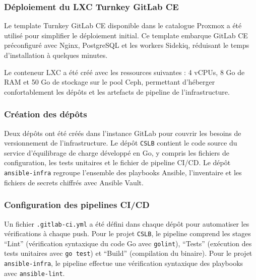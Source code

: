 \subsubsection{Déploiement du LXC Turnkey GitLab CE}

\par Le template Turnkey GitLab CE disponible dans le catalogue Proxmox a été utilisé pour simplifier le déploiement initial. Ce template embarque GitLab CE préconfiguré avec Nginx, PostgreSQL et les workers Sidekiq, réduisant le temps d'installation à quelques minutes.\\

\par Le conteneur LXC a été créé avec les ressources suivantes : 4 vCPUs, 8 Go de RAM et 50 Go de stockage sur le pool Ceph, permettant d'héberger confortablement les dépôts et les artefacts de pipeline de l'infrastructure.\\

\subsubsection{Création des dépôts}

\par Deux dépôts ont été créés dans l'instance GitLab pour couvrir les besoins de versionnement de l'infrastructure. Le dépôt \texttt{CSLB} contient le code source du service d'équilibrage de charge développé en Go, y compris les fichiers de configuration, les tests unitaires et le fichier de pipeline CI/CD. Le dépôt \texttt{ansible-infra} regroupe l'ensemble des playbooks Ansible, l'inventaire et les fichiers de secrets chiffrés avec Ansible Vault.\\

\subsubsection{Configuration des pipelines CI/CD}

\par Un fichier \texttt{.gitlab-ci.yml} a été défini dans chaque dépôt pour automatiser les vérifications à chaque push. Pour le projet \texttt{CSLB}, le pipeline comprend les stages ``Lint'' (vérification syntaxique du code Go avec \texttt{golint}), ``Tests'' (exécution des tests unitaires avec \texttt{go test}) et ``Build'' (compilation du binaire). Pour le projet \texttt{ansible-infra}, le pipeline effectue une vérification syntaxique des playbooks avec \texttt{ansible-lint}.

